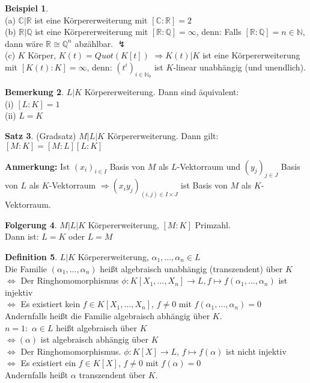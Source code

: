 \documentclass[10pt,a4paper,numbers=endperiod]{scrreprt}
\theoremstyle{definition}
\newtheorem{satz}{Satz}[section]
\newtheorem{defi}[satz]{Definition}
\newtheorem{bem}[satz]{Bemerkung}
\newtheorem{bsp}[satz]{Beispiel}
\newtheorem{folg}[satz]{Folgerung}
\def\QQ{{\mathbb Q}}
\def\CC{{\mathbb C}}
\def\RR{{\mathbb R}}
\def\NN{{\mathbb N}}
\begin{document}
\begin{bsp}
	$ $\\
	(a) $\CC|\RR$ ist eine Körpererweiterung mit $[\CC:\RR] = 2$\\
	(b) $\RR|\QQ$ ist eine Körpererweiterung mit $[\RR: \QQ] = \infty$, denn: Falls $[\RR: \QQ] = n \in \NN$, dann wäre $\RR \cong \QQ^n$ abzählbar. $\lightning$\\
	(c) $K$ Körper, $K(t) = Quot(K[t])$ $\Rightarrow K(t) |K$ ist eine Körpererweiterung mit $[K(t): K] = \infty$, denn: $(t^i)_{i \in \NN_0}$ ist $K$-linear unabhängig (und unendlich). 
\end{bsp}

\begin{bem}
	$L|K$ Körpererweiterung. Dann sind äquivalent:\\
	(i) $[L:K] = 1$\\
	(ii) $L = K$
\end{bem}

\begin{satz}
	(Gradsatz) $M|L|K$ Körpererweiterung. Dann gilt:\\
	$[M:K] = [M:L][L:K]$
\end{satz}

\textbf{Anmerkung:} Ist $(x_i)_{i \in I}$ Basis von $M$ als $L$-Vektorraum und $(y_j)_{j \in J}$ Basis von $L$ als $K$-Vektorraum $\Rightarrow (x_iy_j)_{(i,j) \in I \times J}$ ist Basis von $M$ als $K$-Vektorraum.

\begin{folg}
	$M|L|K$ Körpererweiterung, $[M:K]$ Primzahl.\\
	Dann ist: $L = K$ oder $L = M$
\end{folg}

\begin{defi}
	$L |K$ Körpererweiterung, $\alpha_1, \ldots, \alpha_n \in L$\\
	Die Familie $(\alpha_1, \ldots, \alpha_n)$ heißt algebraisch unabhängig (transzendent) über $K$\\
	$\Leftrightarrow$ Der Ringhomomorphismus $\phi: K[X_1, \ldots, X_n] \rightarrow L, f \mapsto f(\alpha_1, \ldots, \alpha_n)$ ist injektiv\\
	$\Leftrightarrow$ Es existiert kein $f \in K[X_1, \ldots, X_n]$, $f \neq 0$ mit $f(\alpha_1, \ldots, \alpha_n) = 0$\\
	Andernfalls heißt die Familie algebraisch abhängig über $K$.\\
	$n = 1:$ $\alpha \in L$ heißt algebraisch über $K$\\
	$\Leftrightarrow (\alpha)$ ist algebraisch abhängig über $K$\\
	$\Leftrightarrow$ Der Ringhomomorphismus. $\phi: K[X] \rightarrow L$, $f \mapsto f(\alpha)$ ist nicht injektiv\\
	$\Leftrightarrow$ Es existiert ein $f \in K[X]$, $f \neq 0$ mit $f(\alpha) = 0$\\
	Andernfalls heißt $\alpha$ transzendent über $K$.
\end{defi}
\end{document}

